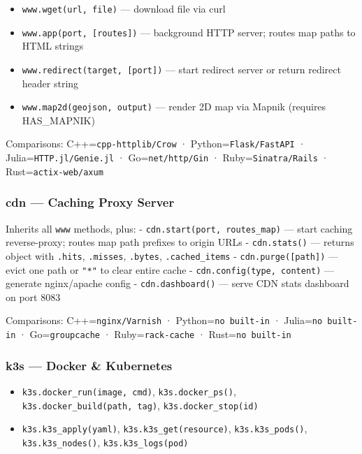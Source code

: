 \documentclass[
]{article}
\providecommand{\tightlist}{%
  \setlength{\itemsep}{0pt}\setlength{\parskip}{0pt}}
\begin{document}
\begin{itemize}
\tightlist
\item
  \texttt{www.wget(url,\ file)} --- download file via curl
\item
  \texttt{www.app(port,\ {[}routes{]})} --- background HTTP server;
  routes map paths to HTML strings
\item
  \texttt{www.redirect(target,\ {[}port{]})} --- start redirect server
  or return redirect header string
\item
  \texttt{www.map2d(geojson,\ output)} --- render 2D map via Mapnik
  (requires HAS\_MAPNIK)
\end{itemize}

Comparisons: C++=\texttt{cpp-httplib/Crow} ·
Python=\texttt{Flask/FastAPI} · Julia=\texttt{HTTP.jl/Genie.jl} ·
Go=\texttt{net/http/Gin} · Ruby=\texttt{Sinatra/Rails} ·
Rust=\texttt{actix-web/axum}

\subsubsection{cdn --- Caching Proxy
Server}\label{cdn-caching-proxy-server}

Inherits all \texttt{www} methods, plus: -
\texttt{cdn.start(port,\ routes\_map)} --- start caching reverse-proxy;
routes map path prefixes to origin URLs - \texttt{cdn.stats()} ---
returns object with \texttt{.hits}, \texttt{.misses}, \texttt{.bytes},
\texttt{.cached\_items} - \texttt{cdn.purge({[}path{]})} --- evict one
path or \texttt{"*"} to clear entire cache -
\texttt{cdn.config(type,\ content)} --- generate nginx/apache config -
\texttt{cdn.dashboard()} --- serve CDN stats dashboard on port 8083

Comparisons: C++=\texttt{nginx/Varnish} · Python=\texttt{no\ built-in} ·
Julia=\texttt{no\ built-in} · Go=\texttt{groupcache} ·
Ruby=\texttt{rack-cache} · Rust=\texttt{no\ built-in}

\subsubsection{k3s --- Docker \&
Kubernetes}\label{k3s-docker-kubernetes}

\begin{itemize}
\tightlist
\item
  \texttt{k3s.docker\_run(image,\ cmd)}, \texttt{k3s.docker\_ps()},
  \texttt{k3s.docker\_build(path,\ tag)}, \texttt{k3s.docker\_stop(id)}
\item
  \texttt{k3s.k3s\_apply(yaml)}, \texttt{k3s.k3s\_get(resource)},
  \texttt{k3s.k3s\_pods()}, \texttt{k3s.k3s\_nodes()},
  \texttt{k3s.k3s\_logs(pod)}
\end{itemize}
\end{document}
